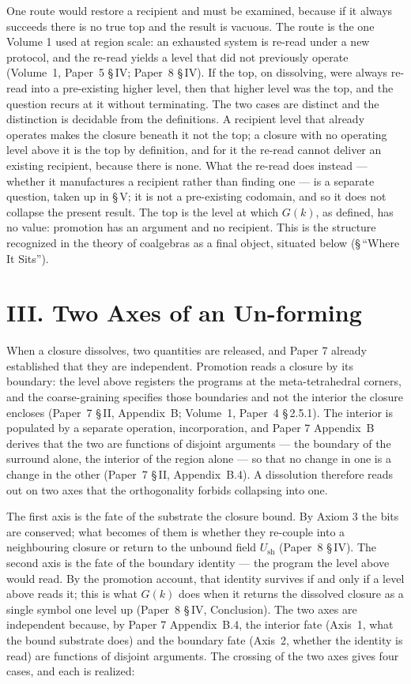 \documentclass[11pt,oneside]{report}
\theoremstyle{definition}
\theoremstyle{remark}
\begin{document}
One route would restore a recipient and must be examined, because if it always succeeds there is
no true top and the result is vacuous. The route is the one Volume 1 used at region scale: an
exhausted system is re-read under a new protocol, and the re-read yields a level that did not
previously operate (Volume~1, Paper~5 \S\,IV; Paper~8 \S\,IV). If the top, on dissolving, were
always re-read into a pre-existing higher level, then that higher level was the top, and the
question recurs at it without terminating. The two cases are distinct and the distinction is
decidable from the definitions. A recipient level that already operates makes the closure beneath
it not the top; a closure with no operating level above it is the top by definition, and for it
the re-read cannot deliver an existing recipient, because there is none. What the re-read does
instead --- whether it manufactures a recipient rather than finding one --- is a separate
question, taken up in \S\,V; it is not a pre-existing codomain, and so it does not collapse the
present result. The top is the level at which \ensuremath{G(k)}, as defined, has no value:
promotion has an argument and no recipient. This is the structure recognized in the theory of coalgebras as a final object, situated below (\S\,``Where It Sits'').

\section*{III. Two Axes of an Un-forming}

When a closure dissolves, two quantities are released, and Paper 7 already established that they
are independent. Promotion reads a closure by its boundary: the level above registers the programs
at the meta-tetrahedral corners, and the coarse-graining specifies those boundaries and not the
interior the closure encloses (Paper~7 \S\,II, Appendix~B; Volume~1, Paper~4 \S\,2.5.1). The
interior is populated by a separate operation, incorporation, and Paper 7 Appendix~B derives that
the two are functions of disjoint arguments --- the boundary of the surround alone, the interior of
the region alone --- so that no change in one is a change in the other (Paper~7 \S\,II,
Appendix~B.4). A dissolution therefore reads out on two axes that the orthogonality forbids
collapsing into one.

The first axis is the fate of the substrate the closure bound. By Axiom 3 the bits are conserved;
what becomes of them is whether they re-couple into a neighbouring closure or return to the unbound
field \ensuremath{U_{\mathrm{sh}}} (Paper~8 \S\,IV). The second axis is the fate of the boundary
identity --- the program the level above would read. By the promotion account, that identity
survives if and only if a level above reads it; this is what \ensuremath{G(k)} does when it returns
the dissolved closure as a single symbol one level up (Paper~8 \S\,IV, Conclusion). The two axes
are independent because, by Paper 7 Appendix~B.4, the interior fate (Axis~1, what the bound
substrate does) and the boundary fate (Axis~2, whether the identity is read) are functions of
disjoint arguments. The crossing of the two axes gives four cases, and each is realized:
\end{document}
